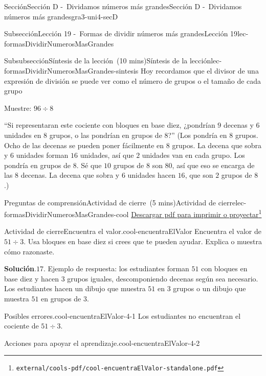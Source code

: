 \documentclass[oneside,10pt,]{article}
\newcommand{\blocktitlefont}{\relax}
\begin{document}
\begin{sectionptx}{Sección}{Sección D -~Dividamos números más grandes}{}{Sección D -~Dividamos números más grandes}{}{}{gra3-uni4-secD}
\begin{subsectionptx}{Subsección}{Lección 19 -~Formas de dividir números más grandes}{}{Lección 19}{}{}{lec-formasDividirNumerosMasGrandes}
\begin{subsubsectionptx}{Subsubsección}{Síntesis de la lección~(10 mins)}{}{Síntesis de la lección}{}{}{lec-formasDividirNumerosMasGrandes-sintesis}
Hoy recordamos que el divisor de una expresión de división se puede ver como el número de grupos o el tamaño de cada grupo%
\par
Muestre: \(96 \div 8\)%
\par
``Si representaran este cociente con bloques en base diez, ¿pondrían \(9\) decenas y \(6\) unidades en \(8\) grupos, o las pondrían en grupos de \(8\)?'' (Los pondría en \(8\) grupos. Ocho de las decenas se pueden poner fácilmente en \(8\) grupos. La decena que sobra y \(6\) unidades forman \(16\) unidades, así que \(2\) unidades van en cada grupo. Los pondría en grupos de \(8\). Sé que \(10\) grupos de \(8\) son \(80\), así que eso se encarga de las \(8\) decenas. La decena que sobra y \(6\) unidades hacen \(16\), que son \(2\) grupos de \(8\).)%
\end{subsubsectionptx}
%
%
\typeout{************************************************}
\typeout{************************************************}
%
\begin{reading-questions-subsubsection}{Preguntas de comprensión}{Actividad de cierre~(5 mins)}{}{Actividad de cierre}{}{}{lec-formasDividirNumerosMasGrandes-cool}
\href{external/cools-pdf/cool-encuentraElValor-standalone.pdf}{Descargar pdf para imprimir o proyectar}\footnote{\nolinkurl{external/cools-pdf/cool-encuentraElValor-standalone.pdf}\label{lec-formasDividirNumerosMasGrandes-cool-5}}\begin{project}{Actividad de cierre}{Encuentra el valor.}{cool-encuentraElValor}%
Encuentra el valor de \(51 \div 3.\) Usa bloques en base diez si crees que te pueden ayudar. Explica o muestra cómo razonaste.%
\par\smallskip%
\noindent\textbf{\blocktitlefont Solución}.\hypertarget{cool-encuentraElValor-3}{}\quad{}\(17\). Ejemplo de respuesta: los estudiantes forman \(51\) con bloques en base diez y hacen \(3\) grupos iguales, descomponiendo decenas según sea necesario. Los estudiantes hacen un dibujo que muestra \(51\) en \(3\) grupos o un dibujo que muestra \(51\) en grupos de \(3\).%
\end{project}%
\par
\begin{paragraphs}{Posibles errores.}{cool-encuentraElValor-4-1}%
Los estudiantes no encuentran el cociente de \(51 \div 3\).%
\end{paragraphs}%
\begin{paragraphs}{Acciones para apoyar el aprendizaje.}{cool-encuentraElValor-4-2}%

\end{paragraphs}
\end{reading-questions-subsubsection}
\end{subsectionptx}
\end{sectionptx}
\end{document}
